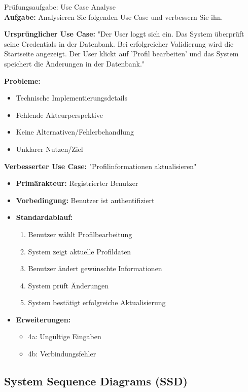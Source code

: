 \begin{example2}{Prüfungsaufgabe: Use Case Analyse}\\
\textbf{Aufgabe:} Analysieren Sie folgenden Use Case und verbessern Sie ihn.

\textbf{Ursprünglicher Use Case:}
"Der User loggt sich ein. Das System überprüft seine Credentials in der Datenbank. 
Bei erfolgreicher Validierung wird die Startseite angezeigt. Der User klickt auf 'Profil bearbeiten' 
und das System speichert die Änderungen in der Datenbank."

\textbf{Probleme:}
\begin{itemize}
    \item Technische Implementierungsdetails
    \item Fehlende Akteurperspektive
    \item Keine Alternativen/Fehlerbehandlung
    \item Unklarer Nutzen/Ziel
\end{itemize}

\textbf{Verbesserter Use Case:}
"Profilinformationen aktualisieren"
\begin{itemize}
    \item \textbf{Primärakteur:} Registrierter Benutzer
    \item \textbf{Vorbedingung:} Benutzer ist authentifiziert
    \item \textbf{Standardablauf:}
    \begin{enumerate}
        \item Benutzer wählt Profilbearbeitung
        \item System zeigt aktuelle Profildaten
        \item Benutzer ändert gewünschte Informationen
        \item System prüft Änderungen
        \item System bestätigt erfolgreiche Aktualisierung
    \end{enumerate}
    \item \textbf{Erweiterungen:}
    \begin{itemize}
        \item 4a: Ungültige Eingaben
        \item 4b: Verbindungsfehler
    \end{itemize}
\end{itemize}
\end{example2}

\subsection{System Sequence Diagrams (SSD)}

